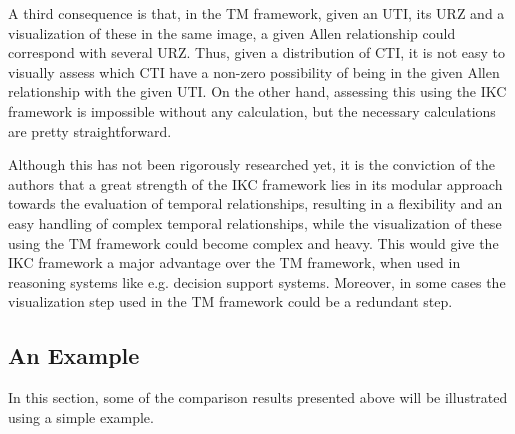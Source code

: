A third consequence is that, in the TM framework, given an UTI, its URZ and a visualization of these in the same image, a given Allen relationship could correspond with several URZ. Thus, given a distribution of CTI, it is not easy to visually assess which CTI have a non-zero possibility of being in the given Allen relationship with the given UTI. On the other hand, assessing this using the IKC framework is impossible without any calculation, but the necessary calculations are pretty straightforward.

Although this has not been rigorously researched yet, it is the conviction of the authors that a great strength of the IKC framework lies in its modular approach towards the evaluation of temporal relationships, resulting in a flexibility and an easy handling of complex temporal relationships, while the visualization of these using the TM framework could become complex and heavy. This would give the IKC framework a major advantage over the TM framework, when used in reasoning systems like e.g. decision support systems. Moreover, in some cases the visualization step used in the TM framework could be a redundant step.



\subsection{\label{subsec:example}An Example}
In this section, some of the comparison results presented above will be illustrated using a simple example.

